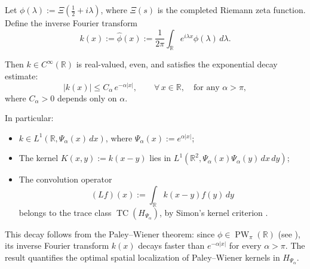 \begin{lemma}
\label{lem:decay_inverse_fourier_xi}
Let \( \phi(\lambda) := \Xi\left( \tfrac{1}{2} + i\lambda \right) \), where \( \Xi(s) \) is the completed Riemann zeta function. Define the inverse Fourier transform
\[
k(x) := \widehat{\phi}(x) := \frac{1}{2\pi} \int_{\mathbb{R}} e^{i\lambda x} \phi(\lambda)\, d\lambda.
\]

Then \( k \in C^\infty(\mathbb{R}) \) is real-valued, even, and satisfies the exponential decay estimate:
\[
|k(x)| \le C_\alpha\, e^{-\alpha |x|}, \qquad \forall\, x \in \mathbb{R}, \quad \text{for any } \alpha > \pi,
\]
where \( C_\alpha > 0 \) depends only on \( \alpha \).

\medskip
\noindent In particular:
\begin{itemize}
  \item \( k \in L^1(\mathbb{R}, \Psi_\alpha(x)\, dx) \), where \( \Psi_\alpha(x) := e^{\alpha |x|} \);
  \item The kernel \( K(x,y) := k(x - y) \) lies in \( L^1(\mathbb{R}^2, \Psi_\alpha(x)\Psi_\alpha(y)\, dx\, dy) \);
  \item The convolution operator
  \[
  (Lf)(x) := \int_{\mathbb{R}} k(x - y) f(y)\, dy
  \]
  belongs to the trace class \( \operatorname{TC}(H_{\Psi_\alpha}) \), by Simon’s kernel criterion \cite[Thm.~4.2]{Simon2005TraceIdeals}.
\end{itemize}

\medskip
\noindent
This decay follows from the Paley--Wiener theorem: since \( \phi \in \operatorname{PW}_\pi(\mathbb{R}) \) (see ), its inverse Fourier transform \( k(x) \) decays faster than \( e^{-\alpha |x|} \) for every \( \alpha > \pi \). The result quantifies the optimal spatial localization of Paley--Wiener kernels in \( H_{\Psi_\alpha} \).
\end{lemma}

